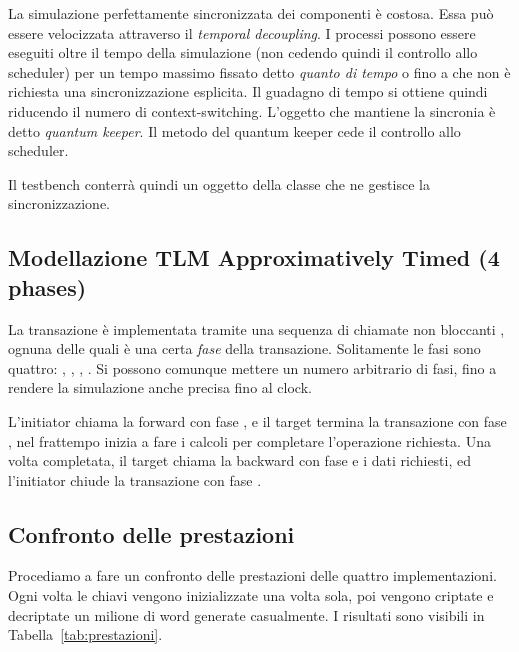 La simulazione perfettamente sincronizzata dei componenti è costosa. Essa può essere velocizzata attraverso il \emph{temporal decoupling}. I processi possono essere eseguiti oltre il tempo della simulazione (non cedendo quindi il controllo allo scheduler) per un tempo massimo fissato detto \emph{quanto di tempo} o fino a che non è richiesta una sincronizzazione esplicita. Il guadagno di tempo si ottiene quindi riducendo il numero di context-switching. L'oggetto che mantiene la sincronia è detto \emph{quantum keeper}. Il metodo  del quantum keeper cede il controllo allo scheduler. 

Il testbench conterrà quindi un oggetto della classe  che ne gestisce la sincronizzazione.

\subsection{Modellazione TLM Approximatively Timed (4 phases)}

La transazione è implementata tramite una sequenza di chiamate non bloccanti , ognuna delle quali è una certa \emph{fase} della transazione. Solitamente le fasi sono quattro: , , , . Si possono comunque mettere un numero arbitrario di fasi, fino a rendere la simulazione anche precisa fino al clock. 

L'initiator chiama la forward con fase , e il target termina la transazione con fase , nel frattempo inizia a fare i calcoli per completare l'operazione richiesta. Una volta completata, il target chiama la backward con fase  e i dati richiesti, ed l'initiator chiude la transazione con fase .

\subsection{Confronto delle prestazioni}

Procediamo a fare un confronto delle prestazioni delle quattro implementazioni. Ogni volta le chiavi vengono inizializzate una volta sola, poi vengono criptate e decriptate un milione di word generate casualmente. I risultati sono visibili in Tabella~\ref{tab:prestazioni}.

